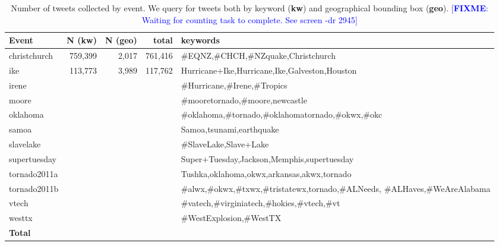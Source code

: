\documentclass{article}
\newcommand{\FIXME}[1]{\textcolor{blue}{[\textbf{FIXME}: {#1}]}}
\begin{document}
\begin{table*}
\centering
\small
\begin{tabular}{|l|r|r|r| p{8cm} |}
\hline
{\bf Event}  & {\bf N (kw)} & {\bf N (geo)} & {\bf total} & {\bf keywords} \\
\hline
christchurch &  759,399  & 2,017       &  761,416    & \#EQNZ,\#CHCH,\#NZquake,Christchurch\\
ike          &  113,773  & 3,989       &  117,762    & Hurricane+Ike,Hurricane,Ike,Galveston,Houston\\
irene        &           &             &             & \#Hurricane,\#Irene,\#Tropics\\
moore        &           &             &             & \#mooretornado,\#moore,newcastle\\
oklahoma     &           &             &             & \#oklahoma,\#tornado,\#oklahomatornado,\#okwx,\#okc\\
samoa        &           &             &             & Samoa,tsunami,earthquake\\
slavelake    &           &             &             & \#SlaveLake,Slave+Lake\\
supertuesday &           &             &             & Super+Tuesday,Jackson,Memphis,supertuesday\\
tornado2011a &           &             &             & Tushka,oklahoma,okwx,arkansas,akwx,tornado\\
tornado2011b &           &             &             & \#alwx,\#okwx,\#txwx,\#tristatewx,tornado,\mbox{\#ALNeeds}, \#ALHaves,\#WeAreAlabama\\
vtech        &           &             &             & \#vatech,\#virginiatech,\#hokies,\#vtech,\#vt\\
westtx       &           &             &             & \#WestExplosion,\#WestTX\\
\hline
{\bf Total}  &           &             &             &\\
\hline
\end{tabular}
\caption{Number of tweets collected by event. We query for tweets both by
  keyword ({\bf kw}) and geographical bounding box ({\bf geo}). \FIXME{Waiting
    for counting task to complete. See screen -dr 2945}\label{tab.data_summary}}
\end{table*}
\end{document}
